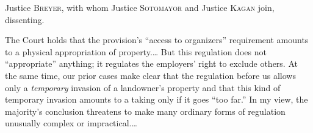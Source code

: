 
\opinion Justice \textsc{Breyer}, with whom Justice \textsc{Sotomayor} and
Justice \textsc{Kagan} join, dissenting.

%
%


The Court holds that the provision's ``access to organizers'' requirement
amounts to a physical appropriation of property.\ldots
But this regulation does
not ``appropriate'' anything; it regulates the employers' right to exclude
others. At the same time, our prior cases make clear that the regulation before
us allows only a \textit{temporary} invasion of a landowner's property and that
this kind of temporary invasion amounts to a taking only if it goes ``too far.''
In my view, the majority's conclusion threatens to make
many ordinary forms of regulation unusually complex or impractical.\ldots


